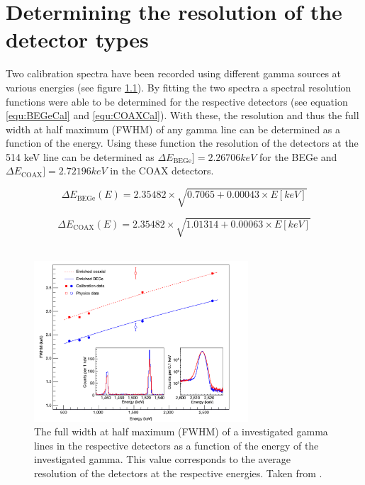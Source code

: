 \appendix

\chapter{Determining the resolution of the detector types}
\label{sec:ResDetermination}


Two calibration spectra have been recorded using different gamma sources at various energies (see figure \ref{fig:Aufloesung})\cite{agostini_background_2017}.
By fitting the two spectra a spectral resolution functions were able to be determined for the respective detectors (see equation \ref{equ:BEGeCal} and \ref{equ:COAXCal}).
With these, the resolution and thus the full width at half maximum (FWHM) of any gamma line can be determined as a function of the energy.
Using these function the resolution of the detectors at the 514 keV line can be determined as $\Delta E_{\mathrm{BEGe}}] =2.26706 \unit{keV}$ for the BEGe and $\Delta E_{\mathrm{COAX}}] = 2.72196 \unit{keV}$ in the COAX detectors.



\begin{equation}
\Delta E_{\mathrm{BEGe}}(E) = 2.35482 \times \sqrt{0.7065+0.00043\times E[\unit{keV}]}
\label{equ:BEGeCal}
\end{equation}

\begin{equation}
\Delta E_{\mathrm{COAX}}(E) = 2.35482 \times \sqrt{1.01314+0.00063\times E[\unit{keV}]}
\label{equ:COAXCal}
\end{equation}
\\

\begin{figure}[t!]
	\centering
	\ifmakefigures%
	\includegraphics[width=80mm]{./Bilder/Aufloesung.png}
	\fi%
	\caption{
		The full width at half maximum (FWHM) of a investigated gamma lines in the respective detectors as a function of the energy of the investigated gamma.
		This value corresponds to the average resolution of the detectors at the respective energies.
		Taken from \cite{agostini_background_2017}.
	}
	\label{fig:Aufloesung}
\end{figure}

